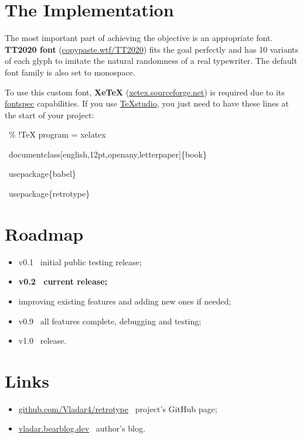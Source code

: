 \documentclass[english,12pt,openany,letterpaper]{book}
\begin{document}
\section{The Implementation}

The most important part of achieving the objective is an appropriate font. \textbf{TT2020 font} (\href{https://copypaste.wtf/TT2020/}{copypaste.wtf/TT2020}) fits the goal perfectly and has 10 variants of each glyph to imitate the natural randomness of a real typewriter. The default font family is also set to monospace.

\tab To use this custom font, \textbf{XeTeX} (\href{https://xetex.sourceforge.net/}{xetex.sourceforge.net}) is required due to its \href{https://ctan.org/pkg/fontspec}{fontspec} capabilities. If you use \href{https://www.texstudio.org/}{TeXstudio}, you just need to have these lines at the start of your project:

\begin{tabbox}[8][8]
\begin{textbox}
~\% !TeX program = xelatex

~\bs documentclass[english,12pt,openany,letterpaper]\{book\}

~\bs usepackage\{babel\}

~\bs usepackage\{retrotype\}
\end{textbox}
\end{tabbox}

\section{Roadmap}

\begin{itemize}
	\item v0.1 \dash\ initial public testing release;
	\item \textbf{v0.2 \dash\ current release;}
	\item improving existing features and adding new ones if needed;
	\item v0.9 \dash\ all features complete, debugging and testing;
	\item v1.0 \dash\ release.
\end{itemize}


\section{Links}

\begin{itemize}
	\item \href{https://github.com/Vladar4/retrotype}{github.com/Vladar4/retrotype} \dash\ project's GitHub page;
	\item \href{https://vladar.bearblog.dev}{vladar.bearblog.dev} \dash\ author's blog.
\end{itemize}
\end{document}
